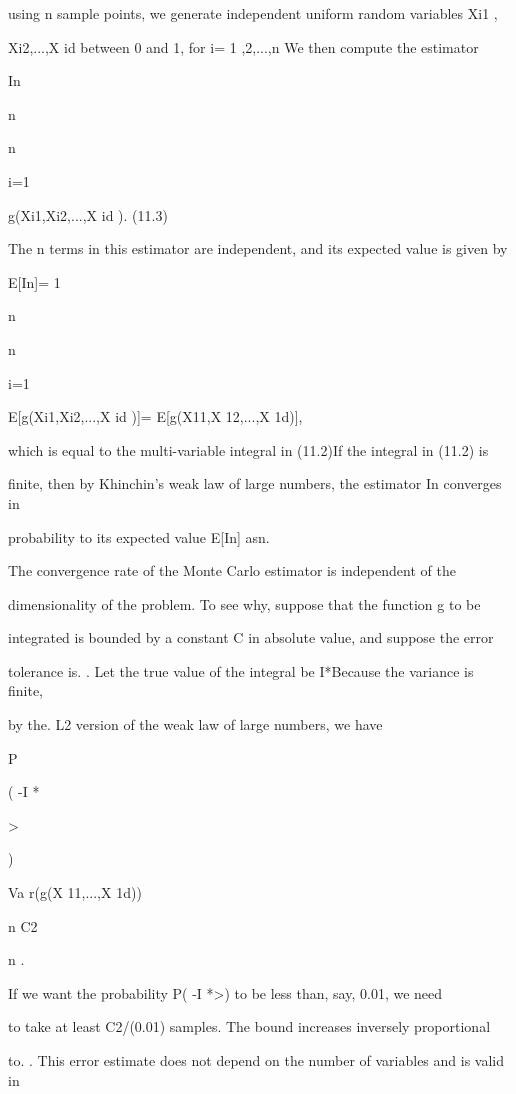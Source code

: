 using n sample points, we generate independent uniform random variables Xi1 ,

Xi2,...,X id between 0 and 1, for i= 1 ,2,...,n We then compute the estimator

In 

n

n\sum

i=1

g(Xi1,Xi2,...,X id ). (11.3)

The n terms in this estimator are independent, and its expected value is given by

E[In]= 1

n

n\sum

i=1

E[g(Xi1,Xi2,...,X id )]= E[g(X11,X 12,...,X 1d)],

which is equal to the multi-variable integral in (11.2)If the integral in (11.2) is

finite, then by Khinchin's weak law of large numbers, the estimator In converges in

probability to its expected value E[In] asn\to\infty .

The convergence rate of the Monte Carlo estimator is independent of the

dimensionality of the problem. To see why, suppose that the function g to be

integrated is bounded by a constant C in absolute value, and suppose the error

tolerance is. \epsilon. Let the true value of the integral be I*Because the variance is finite,

by the. L2 version of the weak law of large numbers, we have

P

( \vert\vert\vertIn -I *

\vert\vert\vert >\epsilon

)

\leq Va r(g(X 11,...,X 1d))

n \leq C2

n .

If we want the probability P( \vertIn -I *\vert>\epsilon ) to be less than, say, 0.01, we need

to take at least C2/(0.01) samples. The bound increases inversely proportional

to. . This error estimate does not depend on the number of variables and is valid in

